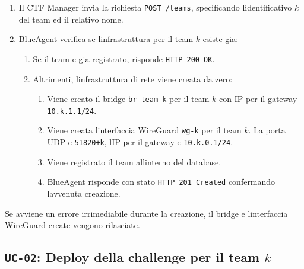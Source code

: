 \begin{enumerate}
\def\labelenumi{\arabic{enumi}.}
\tightlist
\item
  Il CTF Manager invia la richiesta
  \passthrough{\lstinline!POST /teams!}, specificando
  l\textquotesingle identificativo \(k\) del team ed il relativo nome.
\item
  BlueAgent verifica se l\textquotesingle infrastruttura per il team
  \(k\) esiste gia:

  \begin{enumerate}
  \def\labelenumii{\arabic{enumii}.}
  \tightlist
  \item
    Se il team e\textquotesingle{} gia registrato, risponde
    \passthrough{\lstinline!HTTP 200 OK!}.
  \item
    Altrimenti, l\textquotesingle infrastruttura di rete viene creata da
    zero:

    \begin{enumerate}
    \def\labelenumiii{\arabic{enumiii}.}
    \tightlist
    \item
      Viene creato il bridge \passthrough{\lstinline!br-team-k!} per il
      team \(k\) con IP per il gateway
      \passthrough{\lstinline!10.k.1.1/24!}.
    \item
      Viene creata l\textquotesingle interfaccia WireGuard
      \passthrough{\lstinline!wg-k!} per il team \(k\). La porta UDP
      e\textquotesingle{} \passthrough{\lstinline!51820+k!},
      l\textquotesingle IP per il gateway e\textquotesingle{}
      \passthrough{\lstinline!10.k.0.1/24!}.
    \item
      Viene registrato il team all\textquotesingle interno del database.
    \item
      BlueAgent risponde con stato
      \passthrough{\lstinline!HTTP 201 Created!} confermando
      l\textquotesingle avvenuta creazione.
    \end{enumerate}
  \end{enumerate}
\end{enumerate}

Se avviene un errore irrimediabile durante la creazione, il bridge e
l\textquotesingle interfaccia WireGuard create vengono rilasciate.

\subsection{\texorpdfstring{\texttt{UC-02}: Deploy della challenge per
il team
\(k\)}{UC-02: Deploy della challenge per il team k}}\label{uc-02-deploy-della-challenge-per-il-team-k}

